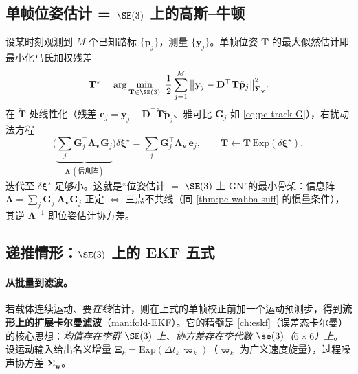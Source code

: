 \subsection{单帧位姿估计 = $\SE(3)$ 上的高斯--牛顿}
\label{sec:pc-track-gn}

\begin{derivation}[多点观测的单帧位姿 GN]
设某时刻观测到 $M$ 个已知路标 $\{\mathbf{p}_j\}$，测量 $\{\mathbf{y}_j\}$。单帧位姿 $\mathbf{T}$ 的最大似然估计即最小化马氏加权残差
\begin{equation}
  \mathbf{T}^\star=\arg\min_{\mathbf{T}\in\SE(3)}\ \frac12\sum_{j=1}^{M}\big\|\mathbf{y}_j-\mathbf{D}^\top\mathbf{T}\tilde{\mathbf{p}}_j\big\|_{\boldsymbol{\Sigma}_{\mathbf v}}^2.
  \label{eq:pc-track-cost}
\end{equation}
在 $\check{\mathbf{T}}$ 处线性化（残差 $\mathbf{e}_j=\mathbf{y}_j-\mathbf{D}^\top\check{\mathbf{T}}\tilde{\mathbf{p}}_j$、雅可比 $\mathbf{G}_j$ 如 \cref{eq:pc-track-G}），右扰动法方程
\begin{equation}
  \Big(\underbrace{\textstyle\sum_j\mathbf{G}_j^\top\boldsymbol{\Lambda}_{\mathbf v}\mathbf{G}_j}_{\boldsymbol{\Lambda}\ (\text{信息阵})}\Big)\delta\boldsymbol{\xi}^\star
  =\sum_j\mathbf{G}_j^\top\boldsymbol{\Lambda}_{\mathbf v}\,\mathbf{e}_j,
  \qquad \check{\mathbf{T}}\leftarrow\check{\mathbf{T}}\,\mathrm{Exp}(\delta\boldsymbol{\xi}^\star),
  \label{eq:pc-track-normal}
\end{equation}
迭代至 $\delta\boldsymbol{\xi}^\star$ 足够小。这就是“位姿估计 $=$ $\SE(3)$ 上 GN”的最小骨架：信息阵 $\boldsymbol{\Lambda}=\sum_j\mathbf{G}_j^\top\boldsymbol{\Lambda}_{\mathbf v}\mathbf{G}_j$ 正定 $\iff$ 三点不共线（同 \cref{thm:pc-wahba-suff} 的惯量条件），其逆 $\boldsymbol{\Lambda}^{-1}$ 即位姿估计协方差。
\end{derivation}

\subsection{递推情形：$\SE(3)$ 上的 EKF 五式}
\label{sec:pc-track-ekf}

\paragraph{从批量到滤波。}若载体连续运动、要\emph{在线}估计，则在上式的单帧校正前加一个运动预测步，得到\textbf{流形上的扩展卡尔曼滤波}（manifold-EKF）。它的精髓是 \cref{ch:eskf}（误差态卡尔曼）的核心思想：\emph{均值存在李群 $\SE(3)$ 上、协方差存在李代数 $\se(3)$（$6\times6$）上}。设运动输入给出名义增量 $\boldsymbol{\Xi}_k=\mathrm{Exp}(\Delta t_k\,\boldsymbol{\varpi}_k)$（$\boldsymbol{\varpi}_k$ 为广义速度旋量），过程噪声协方差 $\boldsymbol{\Sigma}_{\mathbf w}$。

